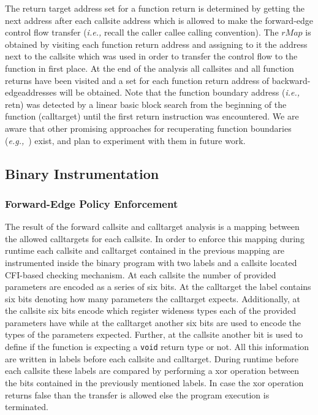The return target address set for a function return is determined by getting the next address after each callsite address 
which is allowed to make the forward-edge control flow transfer
(\textit{i.e.,} recall the caller callee calling convention).
The $rMap$ is obtained by visiting each function return address and assigning to it the address next to the callsite
which was used in order to transfer the control flow to the function in first place. 
At the end of the analysis all callsites and all function returns have been visited and a set for each function return address of backward-edgeaddresses will be obtained.
Note that the function boundary address (\textit{i.e.,} retn) was detected by a linear basic block search from the beginning of 
the function (calltarget) until the first return instruction was encountered. We are aware that other promising approaches for recuperating 
function boundaries (\textit{e.g.,}~\cite{function:boundary}) exist, and plan to experiment with them in future work.

\subsection{Binary Instrumentation}
\subsubsection{Forward-Edge Policy Enforcement}
\label{Enforcing The Forward Edge Policy}
The result of the forward callsite and calltarget analysis is a mapping between the allowed calltargets for each callsite.
In order to enforce this mapping during runtime each callsite and calltarget contained in the previous mapping are instrumented
inside the binary program with two labels and a callsite located CFI-based checking mechanism. At each callsite the number of 
provided parameters are encoded as a series of six bits. At the calltarget the label contains six bits denoting how 
many parameters the calltarget expects. Additionally, at the callsite six bits encode which register wideness types each of the provided parameters have 
while at the calltarget another six bits are used to encode the types of the parameters expected. Further, at the callsite another bit 
is used to define if the function is expecting a \texttt{void} return type or not. All this information are written in labels before
each callsite and calltarget. During runtime before each callsite these labels are compared by performing a xor operation between 
the bits contained in the previously mentioned labels. In case the xor operation returns false
than the transfer is allowed else the program execution is terminated.

